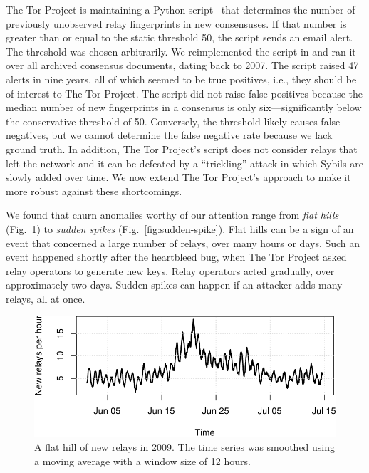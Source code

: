 The Tor Project is maintaining a Python script~\cite{doctor} that determines the
number of previously unobserved relay fingerprints in new consensuses.  If that
number is greater than or equal to the static threshold 50, the script sends an
email alert.  The threshold was chosen arbitrarily.  We reimplemented the script
in \sys and ran it over all archived consensus documents, dating back to
2007.  The script raised 47 alerts in nine years, all of which seemed to be true
positives, i.e., they should be of interest to The Tor Project.  The script did
not raise false positives because the median number of new fingerprints in a
consensus is only six---significantly below the conservative threshold of 50.
Conversely, the threshold likely causes false negatives, but we cannot determine
the false negative rate because we lack ground truth.  In addition, The Tor
Project's script does not consider relays that left the network and it can be
defeated by a ``trickling'' attack in which Sybils are slowly added over time.
We now extend The Tor Project's approach to make it more robust against these
shortcomings.

We found that churn anomalies worthy of our attention range from \emph{flat
hills} (Fig.~\ref{fig:flat-hill}) to \emph{sudden spikes}
(Fig.~\ref{fig:sudden-spike}).  Flat hills can be a sign of an event that
concerned a large number of relays, over many hours or days.  Such an event
happened shortly after the heartbleed bug, when The Tor Project asked relay
operators to generate new keys.  Relay operators acted gradually, over
approximately two days.  Sudden spikes can happen if an attacker adds many
relays, all at once.

\begin{figure}[t]
	\centering
	\includegraphics[width=\linewidth]{diagrams/flat-hill.pdf}
	\caption{A flat hill of new relays in 2009.  The time series was smoothed
	using a moving average with a window size of 12 hours.}
	\label{fig:flat-hill}
\end{figure}

